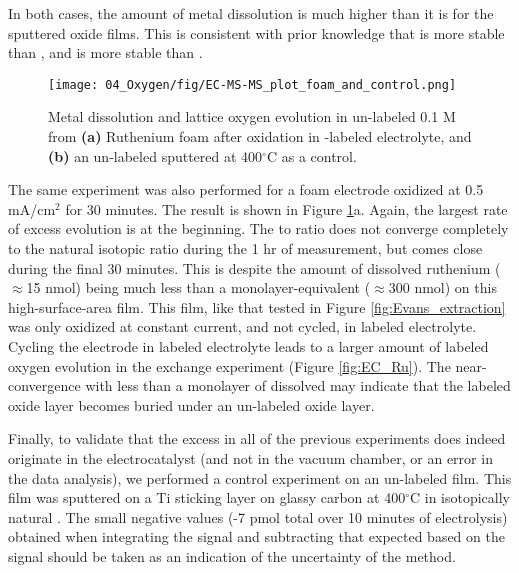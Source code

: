 In both cases, the amount of metal dissolution is much higher than it is for the sputtered oxide films. This is consistent with prior knowledge that  is more stable than \cite{Roy2018, Cherevko2016}, and  is more stable than \cite{Cherevko2016}. 

\begin{figure}
	\texttt{[image: 04\_Oxygen/fig/EC-MS-MS\_plot\_foam\_and\_control.png]}
	\caption{Metal dissolution and lattice oxygen evolution in un-labeled 0.1 M  from \textbf{(a)} Ruthenium foam after oxidation in -labeled electrolyte, and \textbf{(b)} an un-labeled  sputtered at 400$^\circ$C as a control.
	}
	\label{fig:EC-MS-MS_foam}
\end{figure}

The same experiment was also performed for a  foam electrode oxidized at 0.5 mA/cm$^2$ for 30 minutes. The result is shown in Figure \ref{fig:EC-MS-MS_foam}a. Again, the largest rate of excess  evolution is at the beginning. The  to  ratio does not converge completely to the natural isotopic ratio during the 1 hr of measurement, but comes close during the final 30 minutes. This is despite the amount of dissolved ruthenium ($\approx$15 nmol) being much less than a monolayer-equivalent ($\approx$300 nmol) on this high-surface-area film. This film, like that tested in Figure \ref{fig:Evans_extraction} was only oxidized at constant current, and not cycled, in labeled electrolyte. Cycling the electrode in labeled electrolyte leads to a larger amount of labeled oxygen evolution in the exchange experiment (Figure \ref{fig:EC_Ru}). The near-convergence with less than a monolayer of  dissolved may indicate that the labeled oxide layer becomes buried under an un-labeled oxide layer.

Finally, to validate that the excess  in all of the previous experiments does indeed originate in the electrocatalyst (and not in the vacuum chamber, or an error in the data analysis), we performed a control experiment on an un-labeled  film. This film was sputtered on a Ti sticking layer on glassy carbon at 400$^\circ$C in isotopically natural . The small negative values (-7 pmol total over 10 minutes of electrolysis) obtained when integrating the  signal and subtracting that expected based on the  signal should be taken as an indication of the uncertainty of the method.

